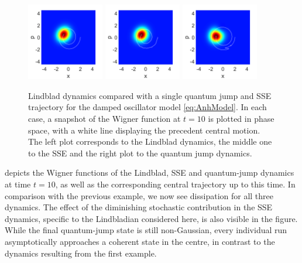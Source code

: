 \documentclass[12pt]{iopart} %
\begin{document}
\begin{figure}
\begin{centering}
	  \includegraphics[width=0.3\textwidth]{WigLindEndAnh.pdf}
	  \includegraphics[width=0.3\textwidth]{WigSemiEndAnh.pdf}
	  \includegraphics[width=0.3\textwidth]{WigJumpEndAnh.pdf}
\caption{Lindblad dynamics compared with a single quantum jump and SSE trajectory for the damped oscillator model \cref{eq:AnhModel}. In each case, a snapshot of the Wigner function at $t=10$ is plotted in phase space, with a white line displaying the precedent central motion. The left plot corresponds to the Lindblad dynamics, the middle one to the SSE and the right plot to the quantum jump dynamics.} \label{fig:WigPlotsAnh}
\end{centering}
\end{figure}
 depicts the Wigner functions of the Lindblad, SSE and quantum-jump dynamics at time $t=10$, as well as the corresponding central trajectory up to this time. In comparison with the previous example, we now see dissipation for all three dynamics. The effect of the diminishing stochastic contribution in the SSE dynamics, specific to the Lindbladian considered here, is also visible in the figure.  While the final quantum-jump state is still non-Gaussian, every individual run asymptotically approaches a coherent state in the centre, in contrast to the dynamics resulting from the first example. 
\end{document}
